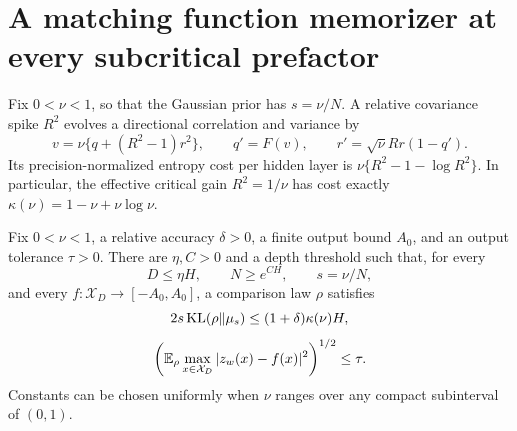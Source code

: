 \section{A matching function memorizer at every subcritical prefactor}
\label{sec:subcritical-prefactor-memorizer}
Fix $0<\nu<1$, so that the Gaussian prior has $s=\nu/N$. A relative covariance spike $R^2$ evolves a directional correlation and variance by
\[
 v=\nu\{q+(R^2-1)r^2\},\qquad
 q'=F(v),\qquad r'=\sqrt\nu Rr(1-q').
\]
Its precision-normalized entropy cost per hidden layer is
$\nu\{R^2-1-\log R^2\}$. In particular, the effective critical gain $R^2=1/\nu$ has cost exactly $\kappa(\nu)=1-\nu+\nu\log\nu$.

\begin{theorem}
\label{thm:subcritical-prefactor-memorizer}
Fix $0<\nu<1$, a relative accuracy $\delta>0$, a finite output bound $A_0$, and an output tolerance $\tau>0$. There are $\eta,C>0$ and a depth threshold such that, for every
\[
 D\le\eta H,\qquad N\ge e^{CH},\qquad s=\nu/N,
\]
and every $f:\mathcal X_D\to[-A_0,A_0]$, a comparison law $\rho$ satisfies
\[
 2s\operatorname{KL}(\rho\|\mu_s)\le(1+\delta)\kappa(\nu)H,
\]
\[
 \left(\mathbb E_\rho\max_{x\in\mathcal X_D}|z_w(x)-f(x)|^2\right)^{1/2}
 \le\tau.
\]
Constants can be chosen uniformly when $\nu$ ranges over any compact subinterval of $(0,1)$.
\end{theorem}
